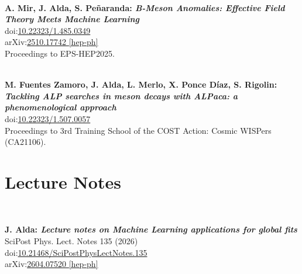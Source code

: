 \documentclass[12pt, a4paper]{article}
\begin{document}
~

\textbf{A. Mir, J. Alda, S. Pe\~naranda: \textit{B-Meson Anomalies: Effective Field Theory Meets Machine Learning}}\\
doi:\href{https://doi.org/10.22323/1.485.0349}{10.22323/1.485.0349}\\
arXiv:\href{https://arxiv.org/abs/2510.17742}{2510.17742 [hep-ph]}\\
Proceedings to EPS-HEP2025.\\

~

\textbf{M. Fuentes Zamoro, J. Alda, L. Merlo, X. Ponce D\'iaz, S. Rigolin: \textit{Tackling ALP searches in meson decays with ALPaca: a phenomenological approach}}\\
doi:\href{https://doi.org/10.22323/1.507.0057}{10.22323/1.507.0057}\\
Proceedings to 3rd Training School of the COST Action: Cosmic WISPers (CA21106).

\section{Lecture Notes}

~

\textbf{J. Alda: \textit{Lecture notes on Machine Learning applications for global fits}}\\
SciPost Phys. Lect. Notes 135 (2026)\\
doi:\href{https://doi.org/10.21468/SciPostPhysLectNotes.135}{10.21468/SciPostPhysLectNotes.135}\\
arXiv:\href{https://arxiv.org/abs/2604.07520}{2604.07520 [hep-ph]}
\end{document}
